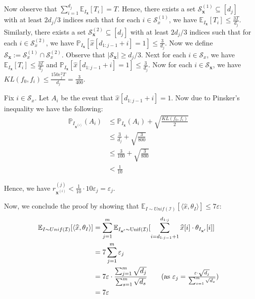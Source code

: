     Now observe that $\sum_{i=1}^{d_j}\mathbb{E}_{I_{\mathbf{x}}}[T_i]=T$. Hence, there exists a set $\mathcal{S}_\mathbf{x}^{(1)}\subseteq[d_j]$ with at least $2d_j/3$ indices such that for each $i\in \mathcal{S}_x^{(1)}$, we have $\mathbb{E}_{I_{\mathbf{x}}}[T_i]\leq \frac{3T}{d_j}$. Similarly, there exists a set $\mathcal{S}_\mathbf{x}^{(2)}\subseteq[d_j]$ with at least $2d_j/3$ indices such that for each $i\in \mathcal{S}_x^{(2)}$, we have $\mathbb{P}_{I_{\mathbf{x}}}[\widehat{x}[d_{1:j-1}+i]=1]\leq \frac{3}{d_j}$. Now we define $\mathcal{S}_\mathbf{x}:=\mathcal{S}_x^{(1)}\cap \mathcal{S}_x^{(2)}$. Observe that $|\mathcal{S}_\mathbf{x}|\geq d_j/3$. Next for each $i\in \mathcal{S}_x$, we have $\mathbb{E}_{I_{\mathbf{x}}}[T_i]\leq \frac{3T}{d_j}$ and $\mathbb{P}_{I_{\mathbf{x}}}[\widehat{x}[d_{1:j-1}+i]=1]\leq \frac{3}{d_j}$. Now for each $i\in \mathcal{S}_\mathbf{x}$, we have $KL(f_0,f_i)\leq\frac{150\varepsilon_j^2T}{d_j}=\frac{3}{400}$. 

    Fix $i\in \mathcal{S}_x$. Let $A_i$ be the event that $\widehat{x}[d_{1:j-1}+i]=1$. Now due to Pinsker's inequality we have the following:
    \begin{align*}
        \mathbb{P}_{I_{\mathbf{x}^{(i)}}}(A_i)&\leq  \mathbb{P}_{I_{\mathbf{x}}}(A_i)+\sqrt{\frac{KL(f_0,f_i)}{2}}\\
        &\leq \frac{3}{d_j}+\sqrt{\frac{3}{800}}\\
        &\leq\frac{3}{100}+\sqrt{\frac{3}{800}}\tag{as $d_j\geq 100$}\\
        &< \frac{1}{10}
    \end{align*}

    Hence, we have $r^{(j)}_{\mathbf{x}^{(i)}} < \frac{1}{10}\cdot 10\varepsilon_j= \varepsilon_j$.

    Now, we conclude the proof by showing that $\mathbb{E}_{I\sim Unif(\mathcal{I})}[\langle \widehat{x}, \theta_I\rangle]\leq 7\varepsilon$:
    \begin{align*}
        \mathbb{E}_{I\sim Unif(\mathcal{I})}[\langle \widehat{x}, \theta_I\rangle]&=\sum_{j=1}^m \mathbb{E}_{I_{\mathbf{x}'}\sim \mathrm{Unif}(\mathcal{I})}[\sum_{i=d_{1:j-1}+1}^{d_{1:j}}\widehat{x}[i]\cdot \theta_{I_{\mathbf{x}'}}[i]]\\
        &=7\sum_{j=1}^m \varepsilon_j\\
        &=7\varepsilon\cdot\frac{\sum_{j=1}^m \sqrt{d_j}}{\sum_{s=1}^m \sqrt{d_s}}\tag{as $\varepsilon_j=\frac{\varepsilon\cdot\sqrt{d_j}}{\sum_{s=1}^m \sqrt{d_s}}$}\\
        &=7\varepsilon
    \end{align*}

